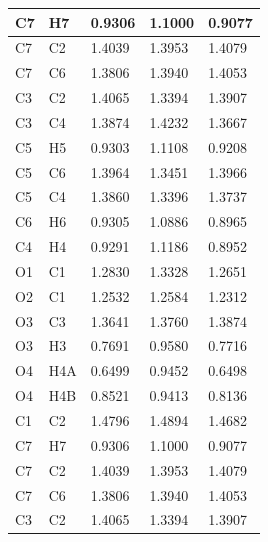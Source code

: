 \begin{longtable}{|l|l|lll|}
C7 & H7 & \multicolumn{1}{l|}{0.9306} & \multicolumn{1}{l|}{1.1000} & 0.9077 \\ \hline
C7 & C2 & \multicolumn{1}{l|}{1.4039} & \multicolumn{1}{l|}{1.3953} & 1.4079 \\ \hline
C7 & C6 & \multicolumn{1}{l|}{1.3806} & \multicolumn{1}{l|}{1.3940} & 1.4053 \\ \hline
C3 & C2 & \multicolumn{1}{l|}{1.4065} & \multicolumn{1}{l|}{1.3394} & 1.3907 \\ \hline
C3 & C4 & \multicolumn{1}{l|}{1.3874} & \multicolumn{1}{l|}{1.4232} & 1.3667 \\ \hline
C5 & H5 & \multicolumn{1}{l|}{0.9303} & \multicolumn{1}{l|}{1.1108} & 0.9208 \\ \hline
C5 & C6 & \multicolumn{1}{l|}{1.3964} & \multicolumn{1}{l|}{1.3451} & 1.3966 \\ \hline
C5 & C4 & \multicolumn{1}{l|}{1.3860} & \multicolumn{1}{l|}{1.3396} & 1.3737 \\ \hline
C6 & H6 & \multicolumn{1}{l|}{0.9305} & \multicolumn{1}{l|}{1.0886} & 0.8965 \\ \hline
C4 & H4 & \multicolumn{1}{l|}{0.9291} & \multicolumn{1}{l|}{1.1186} & 0.8952 \\ \hline
O1 & C1 & \multicolumn{1}{l|}{1.2830} & \multicolumn{1}{l|}{1.3328} & 1.2651 \\ \hline
O2 & C1 & \multicolumn{1}{l|}{1.2532} & \multicolumn{1}{l|}{1.2584} & 1.2312 \\ \hline
O3 & C3 & \multicolumn{1}{l|}{1.3641} & \multicolumn{1}{l|}{1.3760} & 1.3874 \\ \hline
O3 & H3 & \multicolumn{1}{l|}{0.7691} & \multicolumn{1}{l|}{0.9580} & 0.7716 \\ \hline
O4 & H4A & \multicolumn{1}{l|}{0.6499} & \multicolumn{1}{l|}{0.9452} & 0.6498 \\ \hline
O4 & H4B & \multicolumn{1}{l|}{0.8521} & \multicolumn{1}{l|}{0.9413} & 0.8136 \\ \hline
C1 & C2 & \multicolumn{1}{l|}{1.4796} & \multicolumn{1}{l|}{1.4894} & 1.4682 \\ \hline
C7 & H7 & \multicolumn{1}{l|}{0.9306} & \multicolumn{1}{l|}{1.1000} & 0.9077 \\ \hline
C7 & C2 & \multicolumn{1}{l|}{1.4039} & \multicolumn{1}{l|}{1.3953} & 1.4079 \\ \hline
C7 & C6 & \multicolumn{1}{l|}{1.3806} & \multicolumn{1}{l|}{1.3940} & 1.4053 \\ \hline
C3 & C2 & \multicolumn{1}{l|}{1.4065} & \multicolumn{1}{l|}{1.3394} & 1.3907 \\ \hline

\end{longtable}
